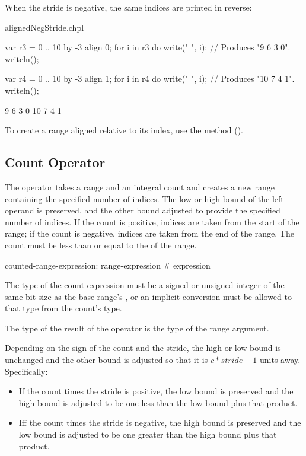 When the stride is negative, the same indices are printed in reverse:
\begin{chapelexample}{alignedNegStride.chpl}
\begin{chapel}
var r3 = 0 .. 10 by -3 align 0;
for i in r3 do
  write(" ", i);			// Produces "9 6 3 0".
writeln();

var r4 = 0 .. 10 by -3 align 1;
for i in r4 do
  write(" ", i);			// Produces "10 7 4 1".
writeln();
\end{chapel}
\begin{chapeloutput}
 9 6 3 0
 10 7 4 1
\end{chapeloutput}
\end{chapelexample}

To create a range aligned relative to its  index, use
the  method ().


\subsection{Count Operator}
\label{Count_Operator}

The \chpl{#} operator takes a range and an integral count and creates a new
range containing the specified number of indices.  The low or high bound of the
left operand is preserved, and the other bound adjusted to provide the specified
number of indices.  If the count is positive, indices are taken from the start
of the range; if the count is negative, indices are taken from the end of the
range.  The count must be less than or equal to the  of the range.

\begin{syntax}
counted-range-expression:
  range-expression # expression
\end{syntax}

The type of the count expression must be a signed or unsigned integer
of the same bit size as the base range's , or an
implicit conversion must be allowed to that type from the count's
type.

The type of the result of the \chpl{#} operator is the type of the
range argument.

Depending on the sign of the count and the stride, the high or low bound is
unchanged and the other bound is adjusted so that it is $c * stride - 1$ units
away.  Specifically:
\begin{itemize}
\item If the count times the stride is positive, the low bound is preserved
and the high bound is adjusted to be one less than the low bound plus that
product.
\item Iff the count times the stride is negative, the high bound is preserved
and the low bound is adjusted to be one greater than the high bound plus that
product.
\end{itemize}

